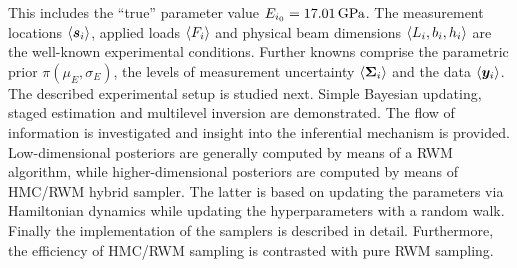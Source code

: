 This includes the ``true'' parameter value \(E_{\analyzed} = \unit[17.01]{GPa}\).
The measurement locations \(\langle{\bm{s}_i}\rangle\), applied loads \(\langle{F_i}\rangle\) and physical beam dimensions \(\langle{L_i,b_i,h_i}\rangle\) are the well-known experimental conditions.
Further knowns comprise the parametric prior \(\pi(\mu_E,\sigma_E)\), the levels of measurement uncertainty \(\langle{\bm{\Sigma}_i}\rangle\) and the data \(\langle{\bm{y}_i}\rangle\).
The described experimental setup is studied next.
Simple Bayesian updating, staged estimation and multilevel inversion are demonstrated.
The flow of information is investigated and insight into the inferential mechanism is provided.
Low-dimensional posteriors are generally computed by means of a RWM algorithm, while higher-dimensional posteriors are computed by means of HMC/RWM hybrid sampler.
The latter is based on updating the parameters via Hamiltonian dynamics while updating the hyperparameters with a random walk.
Finally the implementation of the samplers is described in detail.
Furthermore, the efficiency of HMC/RWM sampling is contrasted with pure RWM sampling.

